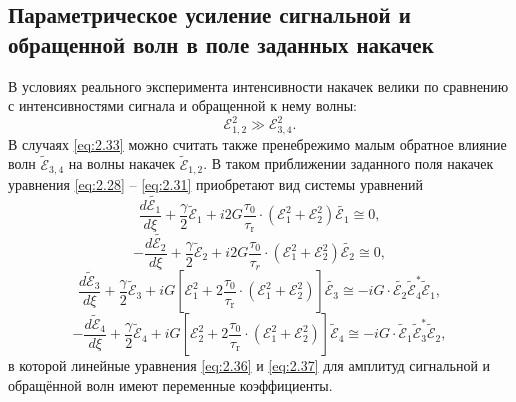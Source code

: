 \subsection{Параметрическое усиление сигнальной и
обращенной волн в поле заданных накачек}

В условиях реального эксперимента интенсивности накачек велики по
сравнению с интенсивностями сигнала и обращенной к нему волны:
\begin{equation}
	\label{eq:2.33}
	\mathcal{E}^2_{1,2} \gg \mathcal{E}^2_{3,4}.
\end{equation}
В случаях \eqref{eq:2.33} можно считать также пренебрежимо малым обратное влияние
волн $\tilde{\mathcal{E}}_{3,4}$ на волны накачек $\tilde{\mathcal{E}}_{1,2}$.  В таком приближении заданного поля накачек уравнения \eqref{eq:2.28} -- \eqref{eq:2.31} приобретают вид системы уравнений
\begin{equation}
	\label{eq:2.34}
	\frac{d \tilde{\mathcal{E}_{1}}}{d \xi}+\frac{\gamma}{2} \tilde{\mathcal{E}}_{1}+i 2 G \frac{\tau_{0}}{\tau_{\mathrm{r}}} \cdot\left(\mathcal{E}_{1}^{2}+\mathcal{E}_{2}^{2}\right) \tilde{\mathcal{E}_{1}}  \cong 0 ,
\end{equation}
\begin{equation}
	\label{eq:2.35}
	-\frac{d \tilde{\mathcal{E}_{2}}}{d \xi}+\frac{\gamma}{2} \tilde{\mathcal{E}}_{2}+i 2 G \frac{\tau_{0}}{\tau_{r}} \cdot\left({\mathcal{E}}_{1}^{2}+\mathcal{E}_{2}^{2}\right) \tilde{\mathcal{E}_{2}}  \cong 0,
\end{equation}
\begin{equation}
	\label{eq:2.36}
	\frac{d \tilde{\mathcal{E}}_{3}}{d \xi}+\frac{\gamma}{2} \tilde{\mathcal{E}}_{3}+i G\left[\mathcal{E}_{1}^{2}+2 \frac{\tau_{0}}{\tau_{\mathrm{r}}} \cdot\left({\mathcal { E }}_{1}^{2}+{\mathcal { E }}_{2}^{2}\right)\right] \tilde{{\mathcal { E }}_{3}} \cong-i G \cdot \tilde{{\mathcal { E }}_{2}} \tilde{\mathcal{E}}_{4}^* \tilde{\mathcal{E}}_{1},
\end{equation}
\begin{equation}
	\label{eq:2.37}
	-\frac{d \tilde{\mathcal{E}}_{4}}{d \xi}+\frac{\gamma}{2} \tilde{\mathcal{E}}_{4}+i G\left[\mathcal{E}_{2}^{2}+2 \frac{\tau_{0}}{\tau_{\mathrm{r}}} \cdot\left({\mathcal{E}}_{1}^{2}+{\mathcal { E }}_{2}^{2}\right)\right] \tilde{{\mathcal{E}}}_{4} \cong-i G \cdot \tilde{\mathcal{E}}_{1} \tilde{\mathcal{E}}_{3}^{*} \tilde{\mathcal{E}}_{2},
\end{equation}
в которой линейные уравнения \eqref{eq:2.36} и \eqref{eq:2.37} для амплитуд сигнальной и обращённой волн имеют переменные коэффициенты.


